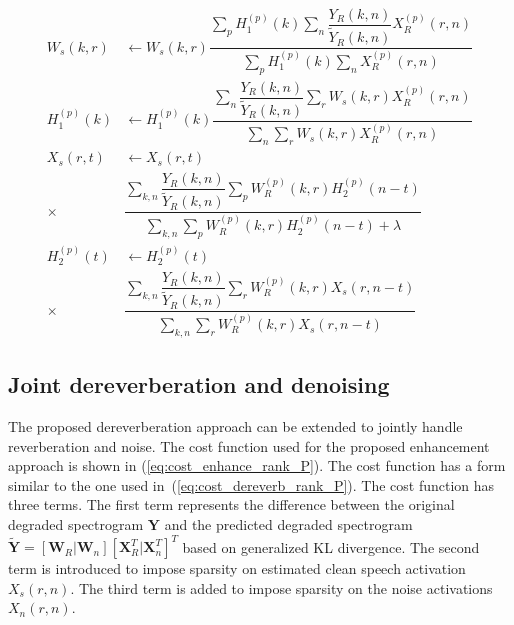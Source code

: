 \begin{align}
W_s(k,r)&\leftarrow W_s(k,r) \dfrac{\sum_p H_1^{(p)}(k)\sum_n \dfrac{Y_R(k,n)}{\tilde{Y}_R(k,n)}X_R^{(p)}(r,n)}{\sum_p H_1^{(p)}(k) \sum_n X_R^{(p)}(r,n)} \nonumber \\
H_1^{(p)}(k) &\leftarrow H_1^{(p)}(k)\dfrac{\sum_n\dfrac{Y_R(k,n)}{\tilde{Y}_R(k,n)}\sum_r W_s(k,r)X_R^{(p)}(r,n)}{\sum_n \sum_r W_s(k,r)X_R^{(p)}(r,n)} \nonumber \\
X_s(r,t) &\leftarrow X_s(r,t) \nonumber \\ 
         \times &\dfrac{\sum_{k,n} \dfrac{Y_R(k,n)}{\tilde{Y}_R(k,n)}  \sum_p W_R^{(p)}(k,r) H_2^{(p)}(n-t)}{\sum_{k,n}  \sum_p W_R^{(p)}(k,r) H_2^{(p)}(n-t) + \lambda} \nonumber \\
H_2^{(p)}(t) &\leftarrow H_2^{(p)}(t) \nonumber\\
\times &\dfrac{\sum_{k,n} \dfrac{Y_R(k,n)}{\tilde{Y}_R(k,n)}\sum_r W_R^{(p)}(k,r)X_s(r,n-t)}{\sum_{k,n} \sum_r W_R^{(p)}(k,r)X_s(r,n-t)}
\label{eq:update_dereverb_rank_P}
\end{align}

\subsection{Joint dereverberation and denoising}
The proposed dereverberation approach can be extended to jointly handle reverberation and noise. 
The cost function used for the proposed enhancement approach is shown in (\ref{eq:cost_enhance_rank_P}). The cost function has a form similar to the one used in~(\ref{eq:cost_dereverb_rank_P}). The cost function has three terms. The  first term represents the difference between the original degraded spectrogram $\mathbf{Y}$ and the predicted degraded spectrogram $\mathbf{\tilde{Y}} = [\mathbf{W}_R | \mathbf{W}_n][\mathbf{X}_R^T| \mathbf{X}_n^T]^T$ based on generalized KL divergence. The second term is introduced to impose sparsity on estimated clean speech activation $X_s(r,n)$. The third term is added to impose sparsity on the noise activations $X_n(r,n)$. 

